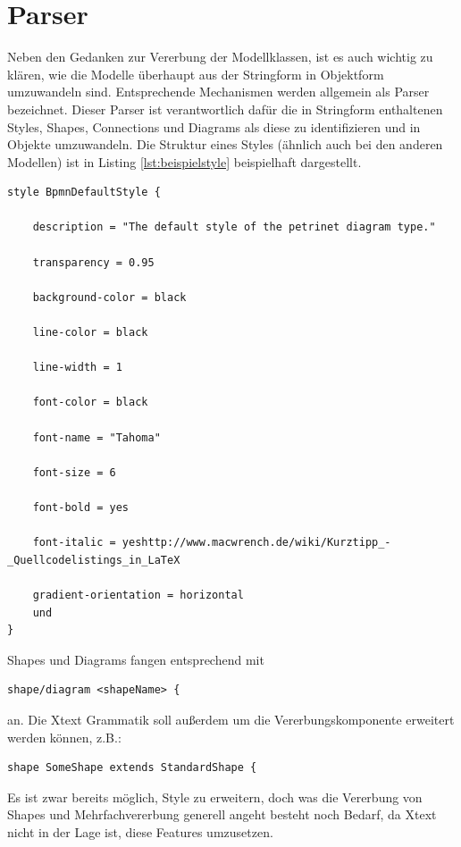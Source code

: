 \section{Parser}Neben den Gedanken zur Vererbung der Modellklassen, ist es auch wichtig zu klären, wie die Modelle überhaupt aus der Stringform in Objektform umzuwandeln sind. Entsprechende Mechanismen werden allgemein als Parser bezeichnet. Dieser Parser ist verantwortlich dafür die in Stringform enthaltenen Styles, Shapes, Connections und Diagrams als diese zu identifizieren und in Objekte umzuwandeln. 
Die Struktur eines Styles (ähnlich auch bei den anderen Modellen) ist in Listing \ref{lst:beispielstyle} beispielhaft dargestellt.
\begin{center}
\label{lst:beispielstyle}
\begin{lstlisting}[style=spray, caption={Beispielhafte Style Definition über die entsprechende Style DSL},label={lst:beispielstyle}]
style BpmnDefaultStyle {

	description = "The default style of the petrinet diagram type."
	
	transparency = 0.95

	background-color = black
	
	line-color = black

	line-width = 1

	font-color = black

	font-name = "Tahoma"
	
	font-size = 6

	font-bold = yes

	font-italic = yeshttp://www.macwrench.de/wiki/Kurztipp_-_Quellcodelistings_in_LaTeX

	gradient-orientation = horizontal
	und
}
\end{lstlisting}
\end{center}
Shapes und Diagrams fangen entsprechend mit
\begin{lstlisting}[style=spray, aboveskip=0pt]
shape/diagram <shapeName> {
\end{lstlisting} an.
Die Xtext Grammatik soll außerdem um die Vererbungskomponente erweitert werden können, z.B.:
\begin{lstlisting}[style=spray, aboveskip=0pt]
shape SomeShape extends StandardShape {
\end{lstlisting}Es ist zwar bereits möglich, Style zu erweitern, doch was die Vererbung von Shapes und Mehrfachvererbung generell angeht besteht noch Bedarf, da Xtext nicht in der Lage ist, diese Features umzusetzen.
